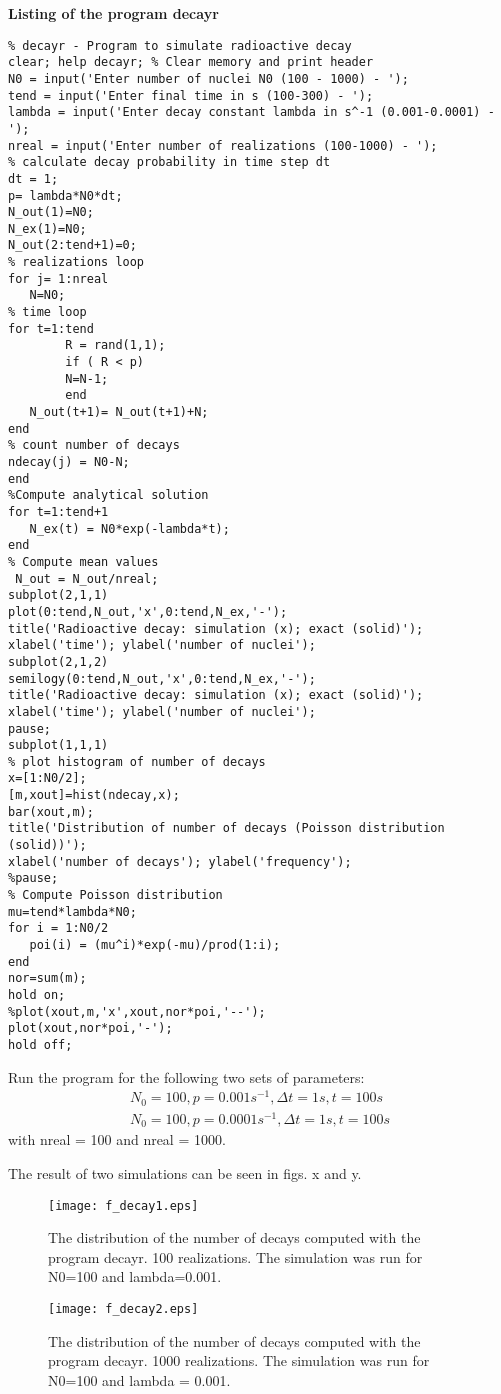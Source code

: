 {\bf Listing of the program decayr}
\begin{verbatim}
% decayr - Program to simulate radioactive decay
clear; help decayr; % Clear memory and print header
N0 = input('Enter number of nuclei N0 (100 - 1000) - ');
tend = input('Enter final time in s (100-300) - ');
lambda = input('Enter decay constant lambda in s^-1 (0.001-0.0001) - ');
nreal = input('Enter number of realizations (100-1000) - ');
% calculate decay probability in time step dt
dt = 1;
p= lambda*N0*dt;
N_out(1)=N0;
N_ex(1)=N0;
N_out(2:tend+1)=0;
% realizations loop
for j= 1:nreal
   N=N0;
% time loop
for t=1:tend 
        R = rand(1,1);
        if ( R < p) 
        N=N-1;
        end
   N_out(t+1)= N_out(t+1)+N;
end
% count number of decays
ndecay(j) = N0-N;
end
%Compute analytical solution
for t=1:tend+1
   N_ex(t) = N0*exp(-lambda*t);
end
% Compute mean values
 N_out = N_out/nreal;
subplot(2,1,1)
plot(0:tend,N_out,'x',0:tend,N_ex,'-');
title('Radioactive decay: simulation (x); exact (solid)'); 
xlabel('time'); ylabel('number of nuclei');
subplot(2,1,2)
semilogy(0:tend,N_out,'x',0:tend,N_ex,'-');
title('Radioactive decay: simulation (x); exact (solid)'); 
xlabel('time'); ylabel('number of nuclei');
pause;
subplot(1,1,1)
% plot histogram of number of decays
x=[1:N0/2];
[m,xout]=hist(ndecay,x);
bar(xout,m);
title('Distribution of number of decays (Poisson distribution (solid))');
xlabel('number of decays'); ylabel('frequency');
%pause;
% Compute Poisson distribution
mu=tend*lambda*N0;
for i = 1:N0/2
   poi(i) = (mu^i)*exp(-mu)/prod(1:i);
end
nor=sum(m);
hold on;
%plot(xout,m,'x',xout,nor*poi,'--');
plot(xout,nor*poi,'-');
hold off;
\end{verbatim}


Run the program for the following two sets of parameters:
\begin{eqnarray*}
N_0= 100, p = 0.001 s^{-1}, \Delta t = 1s, t = 100s \\
N_0= 100, p = 0.0001 s^{-1}, \Delta t = 1s, t = 100s
\end{eqnarray*}
with nreal = 100 and nreal = 1000.

The result of  two simulations can be seen in figs. x and y.
\begin{figure}
\texttt{[image: f\_decay1.eps]}
\caption{The distribution of the number of decays computed with 
the program decayr. 100 realizations. The simulation was run for
N0=100 and lambda=0.001.}
\end{figure}

\begin{figure}
\texttt{[image: f\_decay2.eps]}
\caption{The distribution of the number of decays computed with 
the program decayr. 1000 realizations. The simulation was run
for N0=100 and lambda = 0.001.}
\end{figure}

